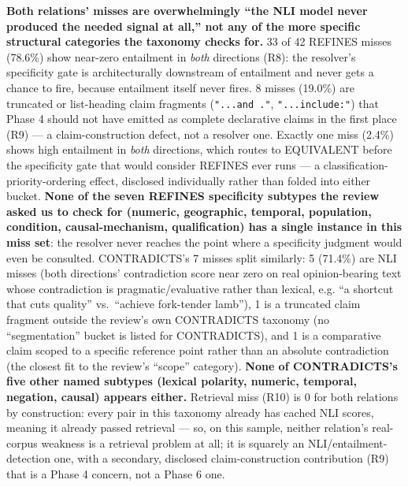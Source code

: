 

\textbf{Both relations' misses are overwhelmingly ``the NLI model never
produced the needed signal at all,'' not any of the more specific
structural categories the taxonomy checks for.} 33 of 42 REFINES misses
(78.6\%) show near-zero entailment in \emph{both} directions (R8): the
resolver's specificity gate is architecturally downstream of entailment
and never gets a chance to fire, because entailment itself never fires.
8 misses (19.0\%) are truncated or list-heading claim fragments
(\texttt{"...and ."}, \texttt{"...include:"}) that Phase 4 should not
have emitted as complete declarative claims in the first place (R9) ---
a claim-construction defect, not a resolver one. Exactly one miss
(2.4\%) shows high entailment in \emph{both} directions, which routes to
EQUIVALENT before the specificity gate that would consider REFINES ever
runs --- a classification-priority-ordering effect, disclosed
individually rather than folded into either bucket. \textbf{None of the
seven REFINES specificity subtypes the review asked us to check for
(numeric, geographic, temporal, population, condition, causal-mechanism,
qualification) has a single instance in this miss set}: the resolver
never reaches the point where a specificity judgment would even be
consulted. CONTRADICTS's 7 misses split similarly: 5 (71.4\%) are NLI
misses (both directions' contradiction score near zero on real
opinion-bearing text whose contradiction is pragmatic/evaluative rather
than lexical, e.g. ``a shortcut that cuts quality'' vs.\ ``achieve
fork-tender lamb''), 1 is a truncated claim fragment outside the
review's own CONTRADICTS taxonomy (no ``segmentation'' bucket is listed
for CONTRADICTS), and 1 is a comparative claim scoped to a specific
reference point rather than an absolute contradiction (the closest fit
to the review's ``scope'' category). \textbf{None of CONTRADICTS's
five other named subtypes (lexical polarity, numeric, temporal,
negation, causal) appears either.} Retrieval miss (R10) is 0 for both
relations by construction: every pair in this taxonomy already has
cached NLI scores, meaning it already passed retrieval --- so, on this
sample, neither relation's real-corpus weakness is a retrieval problem
at all; it is squarely an NLI/entailment-detection one, with a
secondary, disclosed claim-construction contribution (R9) that is a
Phase 4 concern, not a Phase 6 one.

